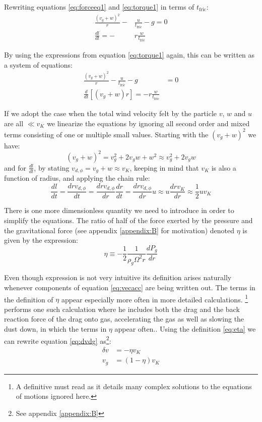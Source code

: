 \documentclass[12pt]{article}
\begin{document}
Rewriting equations \ref{eq:forceeq1} and \ref{eq:torque1} in terms of $t_{\mathrm{fric}}$:
\begin{align}
    \label{eq:}
    \frac{(v_g+w)^2}{r} -& \frac{u}{t_{\mathrm{fric}}} - g = 0 \\
    \frac{dl}{dt} = -&r\frac{w}{t_{\mathrm{fric}}}
\end{align}

By using the expressions from equation \ref{eq:torque1} again, this can be written as a system of equations:
\begin{align}
    \label{eq:forceeq2}
    \frac{(v_g+w)^2}{r} - \frac{u}{t_{\mathrm{fric}}} - g &= 0 \\
    \label{eq:torque2}
    \frac{d}{dt}\left[(v_g+w)r\right] = -r\frac{w}{t_{\mathrm{fric}}}&
\end{align}

If we adopt the case when the total wind velocity felt by the particle $v$, $w$ and $u$ are all $\ll v_K$ we linearize the equations by ignoring all second order and mixed terms consisting of one or multiple small values. Starting with the $(v_g+w)^2$ we have:
$$ (v_g+w)^2 = v_g^2 + 2v_gw + w^2 \approx v_g^2 + 2v_gw $$
and for $\frac{dl}{dt}$, by stating $v_{d, \phi}=v_g+w \approx v_K$, keeping in mind that $v_K$ is also a function of radius, and applying the chain rule:
$$\frac{dl}{dt} = \frac{drv_{d, \phi}}{dt} = \frac{drv_{d, \phi}}{dr}\frac{dr}{dt} = \frac{drv_{d, \phi}}{dr}u \approx u\frac{drv_K}{dr} \approx \frac{1}{2}uv_K$$ 

There is one more dimensionless quantity we need to introduce in order to simplify the equations. The ratio of half of the force exerted by the pressure and the gravitational force (see appendix \ref{appendix:B} for motivation) denoted $\eta$ is given by the expression: 
\begin{equation}
   \label{eq:eta}
    \eta \equiv -\frac{1}{2} \frac{1}{\rho_g \Omega^2 r } \frac{dP_g}{dr}
\end{equation}

Even though expression is not very intuitive its definition arises naturally whenever components of equation \ref{eq:vecacc} are being written out. The terms in the definition of $\eta$ appear especially more often in more detailed calculations. \citet{Nakagawa86}\footnote{A definitive must read as it details many complex solutions to the equations of motions ignored here.} performs one such calculation where he includes both the drag and the back reaction force of the drag onto gas, accelerating the gas as well as slowing the dust down, in which the terms in $\eta$ appear often.. Using the definition \ref{eq:eta} we can rewrite equation \ref{eq:dvdg} as\footnote{See appendix \ref{appendix:B}}: 
\begin{align}
    \delta v &= - \eta v_K \\
    v_g &= (1-\eta)v_K
\end{align}
\end{document}
